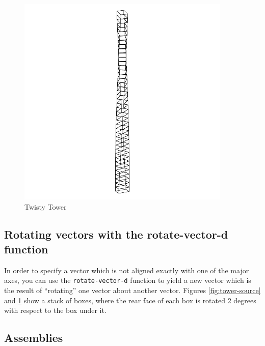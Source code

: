 \documentclass [11pt]{book}
\begin{document}
\begin{figure}
\begin{center}
\includegraphics[width=4in,height=4in]{../images/tower.pdf}
\end{center}

\caption{Twisty Tower }

\label{fig:tower}

\end{figure}


\subsection{Rotating vectors with the rotate-vector-d function}

\label{subsec:rotatingvectorswiththerotate-vector-dfunction}

In order to specify a vector which is not aligned exactly with
one of the major axes, you can use the \texttt{rotate-vector-d} function to yield a new vector which is the result of
     ``rotating'' one vector about another vector. Figures 
\ref{fig:tower-source} and 
\ref{fig:tower} show a stack of boxes, where the rear face of each box is
     rotated 2 degrees with respect to the box under it.

\subsection{Assemblies}

\label{subsec:assemblies}
\end{document}
